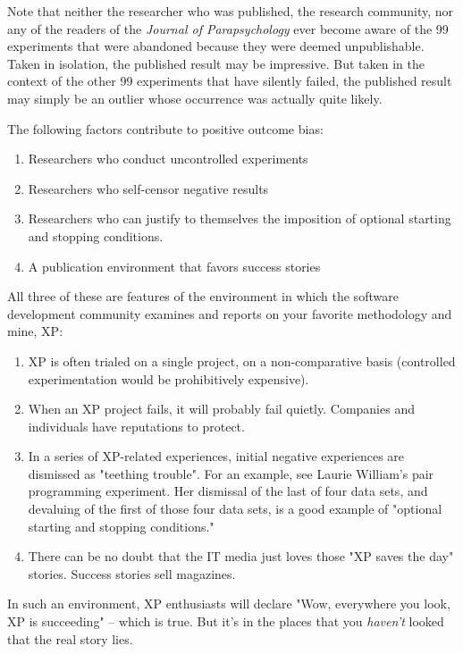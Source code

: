 \documentclass{article}
\begin{document}
\begin{enumerate}
Note that neither the researcher who was published, the research
community, nor any of the readers of the \emph{Journal of Parapsychology}
ever become aware of the 99 experiments that were abandoned because they
were deemed unpublishable. Taken in isolation, the published result may
be impressive. But taken in the context of the other 99 experiments that
have silently failed, the published result may simply be an outlier
whose occurrence was actually quite likely.

The following factors contribute to positive outcome bias:

\begin{enumerate}
\item Researchers who conduct uncontrolled experiments
\item Researchers who self-censor negative results
\item Researchers who can justify to themselves the imposition of optional
starting and stopping conditions.\\
\item A publication environment that favors success stories
\end{enumerate}

All three of these are features of the environment in which the software
development community examines and reports on your favorite methodology
and mine, XP:

\begin{enumerate}
\item XP is often trialed on a single project, on a non-comparative basis
(controlled experimentation would be prohibitively expensive).\\
\item When an XP project fails, it will probably fail quietly. Companies
and individuals have reputations to protect.\\
\item In a series of XP-related experiences, initial negative experiences
are dismissed as "teething trouble". For an example, see Laurie
William's pair programming experiment. Her dismissal of the last of
four data sets, and devaluing of the first of those four data sets,
is a good example of "optional starting and stopping conditions."
\item There can be no doubt that the IT media just loves those "XP saves
the day" stories. Success stories sell magazines.
\end{enumerate}

In such an environment, XP enthusiasts will declare "Wow, everywhere you
look, XP is succeeding" -- which is true. But it's in the places that
you \emph{haven't} looked that the real story lies.


\end{enumerate}
\end{document}
